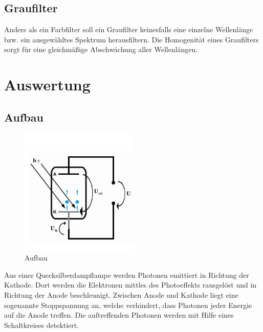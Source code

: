\documentclass{scrartcl}
\begin{document}
	\subsection{Graufilter}
		Anders als ein Farbfilter soll ein Graufilter keinesfalls eine einzelne Wellenlänge bzw. ein ausgewähltes Spektrum 
		herausfiltern. Die Homogenität eines Graufilters sorgt für eine gleichmäßige Abschwächung aller Wellenlängen.
\section{Auswertung}
	\subsection{Aufbau}
		\begin{figure}[H]
			\centering
			\includegraphics[width=0.5\textwidth]{Aufbau.PNG}
			\caption{Aufbau}
		\end{figure}
		Aus einer Quecksilberdampflampe werden Photonen emittiert in Richtung der Kathode. Dort werden
		die Elektronen mittles des Photoeffekts rausgelöst und in Richtung der Anode beschleunigt.
		Zwischen Anode und Kathode liegt eine sogenannte Stoppspannung an, welche verhindert, dass Photonen jeder Energie 
		auf die Anode treffen. Die auftreffenden Photonen werden mit Hilfe eines Schaltkreises detektiert.
\end{document}
